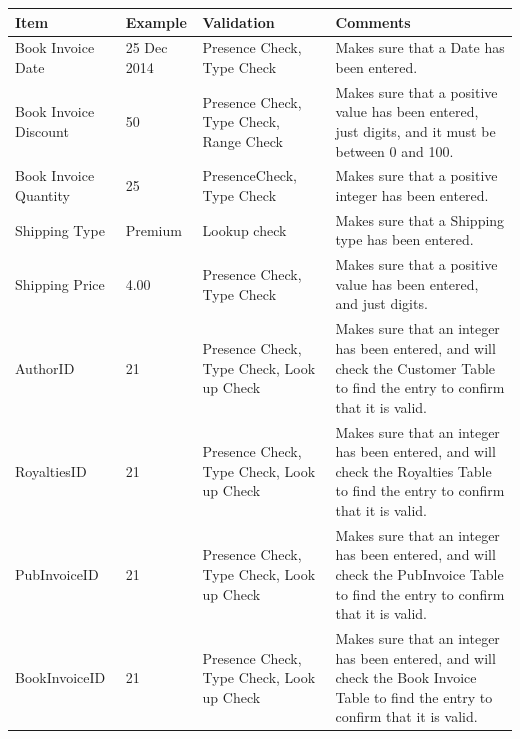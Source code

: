 \begin{center}
    \begin{tabular}{|p{2.5cm}|p{2cm}|p{2cm}|p{3.5cm}|}
    \textbf{Item} & \textbf{Example} & \textbf{Validation} & \textbf{Comments}\\ \hline
    Book Invoice Date & 25 Dec 2014 & Presence Check, Type Check & Makes sure that a Date has been entered. \\ \hline
    Book Invoice Discount & 50 & Presence Check, Type Check, Range Check & Makes sure that a positive value has been entered, just digits, and it must be between 0 and 100. \\ \hline
    Book Invoice Quantity & 25 & PresenceCheck, Type Check & Makes sure that a positive integer has been entered. \\ \hline
    Shipping Type & Premium & Lookup check & Makes sure that a Shipping type has been entered. \\ \hline
    Shipping Price & 4.00 & Presence Check, Type Check & Makes sure that a positive value has been entered, and just digits. \\ \hline
    AuthorID & 21 & Presence Check, Type Check, Look up Check & Makes sure that an integer has been entered, and will check the Customer Table to find the entry to confirm that it is valid. \\ \hline 
    RoyaltiesID & 21 & Presence Check, Type Check, Look up Check & Makes sure that an integer has been entered, and will check the Royalties Table to find the entry to confirm that it is valid. \\ \hline
    PubInvoiceID & 21 & Presence Check, Type Check, Look up Check & Makes sure that an integer has been entered, and will check the PubInvoice Table to find the entry to confirm that it is valid. \\ \hline
    BookInvoiceID & 21 & Presence Check, Type Check, Look up Check & Makes sure that an integer has been entered, and will check the Book Invoice Table to find the entry to confirm that it is valid. \\ \hline
\end{tabular}
\end{center}




